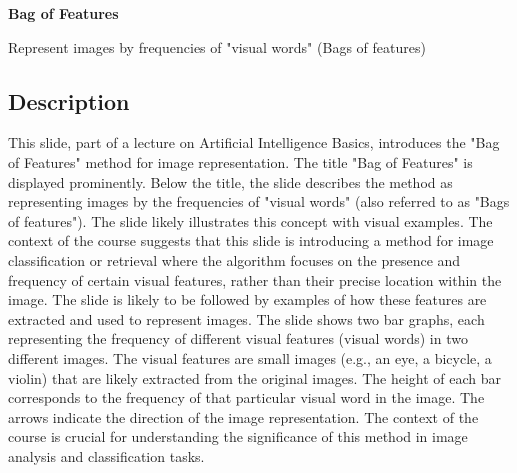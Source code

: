 \documentclass{article}%
\begin{document}
\textbf{Bag of Features}

Represent images by frequencies of "visual words" (Bags of features)
%
\subsection{Description}%
This slide, part of a lecture on Artificial Intelligence Basics, introduces the "Bag of Features" method for image representation.  The title "Bag of Features" is displayed prominently.  Below the title, the slide describes the method as representing images by the frequencies of "visual words" (also referred to as "Bags of features").  The slide likely illustrates this concept with visual examples.  The context of the course suggests that this slide is introducing a method for image classification or retrieval where the algorithm focuses on the presence and frequency of certain visual features, rather than their precise location within the image.  The slide is likely to be followed by examples of how these features are extracted and used to represent images.  The slide shows two bar graphs, each representing the frequency of different visual features (visual words) in two different images.  The visual features are small images (e.g., an eye, a bicycle, a violin) that are likely extracted from the original images.  The height of each bar corresponds to the frequency of that particular visual word in the image.  The arrows indicate the direction of the image representation.  The context of the course is crucial for understanding the significance of this method in image analysis and classification tasks.%
\end{document}
